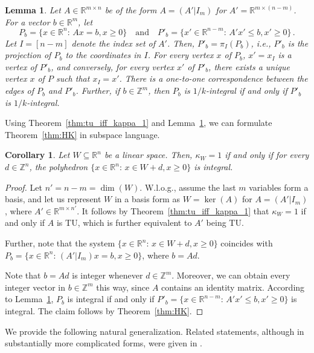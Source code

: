 \documentclass[11pt, a4paper]{article}
\newcommand{\1}{\mathbbm{1}}
\newtheorem{lemma}[theorem]{Lemma}
\newtheorem{cor}[theorem]{Corollary}
\theoremstyle{case}
\newcommand{\R}{\mathbb{R}}
\newcommand{\Z}{\mathbb{Z}}
\begin{document}
\begin{lemma}\label{lem:P-project}
Let $ A\in \R^{m\times n}$ be of the form $A=(A'|I_m)$ for $A'=\R^{m\times (n-m)}$. For a vector $b\in\R^m$, let 
\[P_b=\{x\in\R^n:\, Ax=b, x\ge 0\}\quad\mbox{and}\quad P'_b=\{x'\in\R^{n-m}:\, A'x'\le b, x'\ge 0\}\, .\]
 Let $I=[n-m]$ denote the index set of $A'$. Then,  $P'_b=\pi_I(P_b)$, i.e., $P'_b$ is the projection of $P_b$ to the coordinates in $I$.
For every vertex $x$ of $P_b$,  $x'=x_I$ is a vertex of $P'_b$, and conversely, for every vertex $x'$ of $P'_b$, there exists a unique vertex $x$ of $P$ such that $x_I=x'$. There is a one-to-one correspondence between the edges of $P_b$ and $P'_b$.
Further, if $b\in\Z^m$, then $P_b$ is $1/k$-integral if and only if $P'_b$ is $1/k$-integral.
\end{lemma}

Using Theorem~\ref{thm:tu_iff_kappa_1} and Lemma~\ref{lem:P-project}, we can formulate Theorem~\ref{thm:HK} in subspace language.
\begin{cor}
Let $W\subseteq\R^n$ be a linear space. Then, $\kappa_W=1$ if and only if for every $d\in \Z^n$, the polyhedron $\{x\in\R^n:\, x\in W+d, x\ge 0\}$ is integral.
\end{cor}
\begin{proof}
Let $n'=n-m=\dim(W)$.  W.l.o.g., assume the last  $m$ variables form a basis, and 
let us represent $W$ in a basis form as $W=\ker(A)$ for $A=(A'|I_m)$, where $A'\in\R^{m\times n'}$. It follows by Theorem~\ref{thm:tu_iff_kappa_1} that $\kappa_W=1$ if and only if $A$ is TU, which is further equivalent to $A'$ being TU.

Further, note that the system $\{x\in\R^n:\, x\in W+d, x\ge 0\}$  coincides with  $P_b=\{x\in\R^n:\, (A'|I_m)x=b, x\ge 0\}$, where $b=Ad$.

Note that  $b=Ad$ is integer whenever $d\in\Z^m$. Moreover, we can obtain every integer vector in $b\in\Z^m$ this way, since $A$ contains an identity matrix.
According to Lemma~\ref{lem:P-project}, $P_b$ is integral if and only if $P'_b=\{x\in \R^{n-m}:\, A'x'\le b, x'\ge 0\}$ is integral. The claim follows by Theorem~\ref{thm:HK}.
\end{proof}

We provide the following natural generalization. Related statements, although in substantially more complicated forms, were given in \cite[{Proposition 6.1 and 6.2}]{Lee89}.
\end{document}
